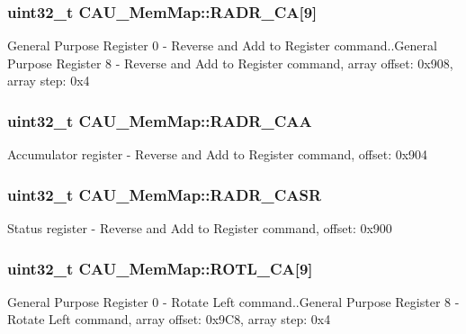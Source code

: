 \subsubsection[{R\+A\+D\+R\+\_\+\+C\+A}]{\setlength{\rightskip}{0pt plus 5cm}uint32\+\_\+t C\+A\+U\+\_\+\+Mem\+Map\+::\+R\+A\+D\+R\+\_\+\+C\+A\mbox{[}9\mbox{]}}\label{struct_c_a_u___mem_map_a9c1999a6a31be1422acd1d33f67f2a9e}
General Purpose Register 0 -\/ Reverse and Add to Register command..General Purpose Register 8 -\/ Reverse and Add to Register command, array offset\+: 0x908, array step\+: 0x4 \hypertarget{struct_c_a_u___mem_map_a46c90a6c642fc19fe7a572b46b746761}{}
\subsubsection[{R\+A\+D\+R\+\_\+\+C\+A\+A}]{\setlength{\rightskip}{0pt plus 5cm}uint32\+\_\+t C\+A\+U\+\_\+\+Mem\+Map\+::\+R\+A\+D\+R\+\_\+\+C\+A\+A}\label{struct_c_a_u___mem_map_a46c90a6c642fc19fe7a572b46b746761}
Accumulator register -\/ Reverse and Add to Register command, offset\+: 0x904 \hypertarget{struct_c_a_u___mem_map_a9d411dd17e1bf0560d6a9537650a39b9}{}
\subsubsection[{R\+A\+D\+R\+\_\+\+C\+A\+S\+R}]{\setlength{\rightskip}{0pt plus 5cm}uint32\+\_\+t C\+A\+U\+\_\+\+Mem\+Map\+::\+R\+A\+D\+R\+\_\+\+C\+A\+S\+R}\label{struct_c_a_u___mem_map_a9d411dd17e1bf0560d6a9537650a39b9}
Status register -\/ Reverse and Add to Register command, offset\+: 0x900 \hypertarget{struct_c_a_u___mem_map_a2048933dd371b9c4145810ace598ce8f}{}
\subsubsection[{R\+O\+T\+L\+\_\+\+C\+A}]{\setlength{\rightskip}{0pt plus 5cm}uint32\+\_\+t C\+A\+U\+\_\+\+Mem\+Map\+::\+R\+O\+T\+L\+\_\+\+C\+A\mbox{[}9\mbox{]}}\label{struct_c_a_u___mem_map_a2048933dd371b9c4145810ace598ce8f}
General Purpose Register 0 -\/ Rotate Left command..General Purpose Register 8 -\/ Rotate Left command, array offset\+: 0x9\+C8, array step\+: 0x4 \hypertarget{struct_c_a_u___mem_map_a512db0326bf0cfd6896ddb5ee85d76ee}{}
